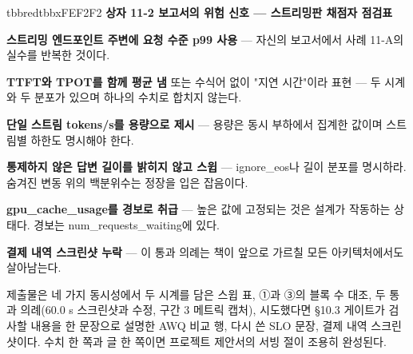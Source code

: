 \begin{calloutbox}{tbbred}{tbbxFEF2F2}
{\normalsize\bfseries\color{tbbx991B1B}상자 11-2  보고서의 위험 신호 — 스트리밍판 채점자 점검표}\par\vspace{3pt}
\begin{tbbitemize}
  \item \textbf{스트리밍 엔드포인트 주변에 요청 수준 p99 사용} — 자신의 보고서에서 사례 11-A의 실수를 반복한 것이다.
  \item \textbf{TTFT와 TPOT를 함께 평균 냄} 또는 수식어 없이 "지연 시간"이라 표현 — 두 시계와 두 분포가 있으며 하나의 수치로 합치지 않는다.
  \item \textbf{단일 스트림 tokens/s를 용량으로 제시} — 용량은 동시 부하에서 집계한 값이며 스트림별 하한도 명시해야 한다.
  \item \textbf{통제하지 않은 답변 길이를 밝히지 않고 스윕} — ignore\_eos나 길이 분포를 명시하라. 숨겨진 변동 위의 백분위수는 정장을 입은 잡음이다.
  \item \textbf{gpu\_cache\_usage를 경보로 취급} — 높은 값에 고정되는 것은 설계가 작동하는 상태다. 경보는 num\_requests\_waiting에 있다.
  \item \textbf{결제 내역 스크린샷 누락} — 이 통과 의례는 책이 앞으로 가르칠 모든 아키텍처에서도 살아남는다.
\end{tbbitemize}
\end{calloutbox}

\vspace{3.0pt}

제출물은 네 가지 동시성에서 두 시계를 담은 스윕 표, ①과 ③의 블록 수 대조, 두 통과 의례(60.0 s 스크린샷과 수정, 구간 3 메트릭 캡처), 시도했다면 §10.3 게이트가 검사할 내용을 한 문장으로 설명한 AWQ 비교 행, 다시 쓴 SLO 문장, 결제 내역 스크린샷이다. 수치 한 쪽과 글 한 쪽이면 프로젝트 제안서의 서빙 절이 조용히 완성된다.

